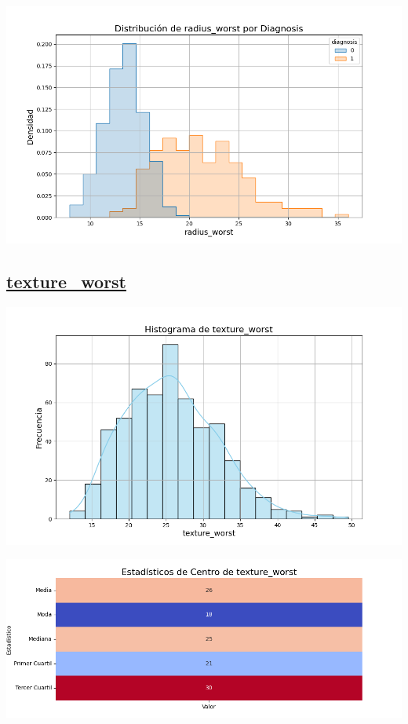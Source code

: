 \documentclass[a4paper, 12pt]{article}
\begin{document}
\includegraphics[width=\textwidth]{../Plots/plots_diagnosis/distribucion_radius_worst_por_diagnosis.png}


\subsection*{\underline{texture\_worst}}

	\includegraphics[width=\textwidth]{../Plots/plots_stats/texture_worst/histograma_texture_worst.png}




\includegraphics[width=\textwidth]{../Plots/plots_stats/texture_worst/estadisticas_centro_texture_worst.png}
\end{document}
